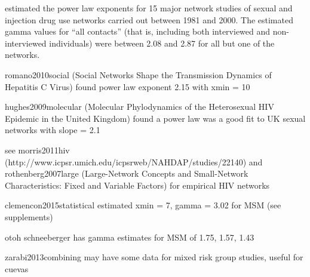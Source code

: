 \textcite{rothenberg2007large} estimated the power law exponents for 15 major
network studies of sexual and injection drug use networks carried out between
1981 and 2000. The estimated \gls{gamma} values for ``all contacts'' (that is,
including both interviewed and non-interviewed individuals) were 
between 2.08 and 2.87 for all but one of the networks. 

romano2010social (Social Networks Shape the Transmission Dynamics of
Hepatitis C Virus) found power law exponent 2.15 with xmin = 10

hughes2009molecular (Molecular Phylodynamics of the Heterosexual HIV Epidemic
in the United Kingdom) found a power law was a good fit to UK sexual networks
with slope = 2.1

see morris2011hiv (http://www.icpsr.umich.edu/icpsrweb/NAHDAP/studies/22140) and
rothenberg2007large (Large-Network Concepts and Small-Network Characteristics:
Fixed and Variable Factors) for empirical HIV networks

clemencon2015statistical estimated xmin = 7, gamma = 3.02 for MSM (see supplements)

otoh schneeberger has gamma estimates for MSM of 1.75, 1.57, 1.43

zarabi2013combining may have some data for mixed risk group studies, useful for cuevas

